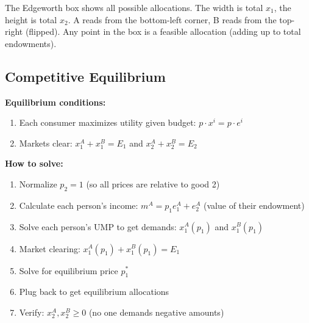 \documentclass[11pt]{article}
\begin{document}
\begin{intuition}
The Edgeworth box shows all possible allocations. The width is total $x_1$, the height is total $x_2$. A reads from the bottom-left corner, B reads from the top-right (flipped). Any point in the box is a feasible allocation (adding up to total endowments).
\end{intuition}

\subsection{Competitive Equilibrium}

\textbf{Equilibrium conditions:}
\begin{enumerate}
    \item Each consumer maximizes utility given budget: $p \cdot x^i = p \cdot e^i$
    \item Markets clear: $x_1^A + x_1^B = E_1$ and $x_2^A + x_2^B = E_2$
\end{enumerate}

\begin{steps}
\textbf{How to solve:}
\begin{enumerate}
    \item Normalize $p_2 = 1$ (so all prices are relative to good 2)
    \item Calculate each person's income: $m^A = p_1 e_1^A + e_2^A$ (value of their endowment)
    \item Solve each person's UMP to get demands: $x_1^A(p_1)$ and $x_1^B(p_1)$
    \item Market clearing: $x_1^A(p_1) + x_1^B(p_1) = E_1$
    \item Solve for equilibrium price $p_1^*$
    \item Plug back to get equilibrium allocations
    \item Verify: $x_2^A, x_2^B \geq 0$ (no one demands negative amounts)
\end{enumerate}
\end{steps}
\end{document}
